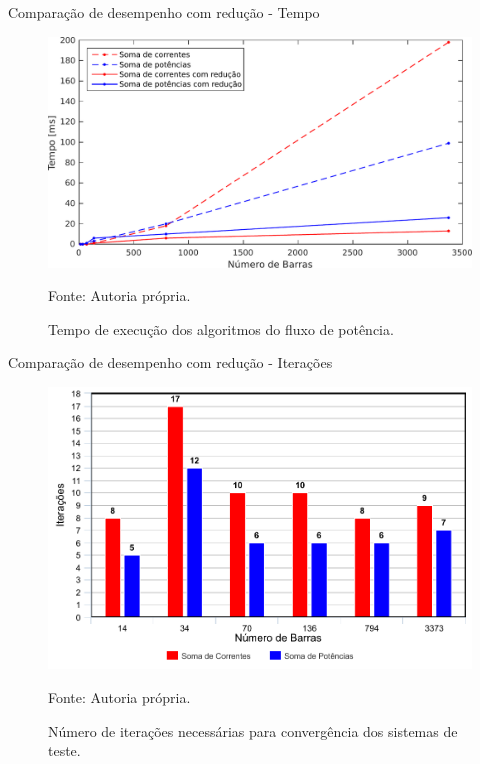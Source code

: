 \documentclass[10pt]{beamer}
\begin{document}
\begin{frame}{Comparação de desempenho com redução - Tempo}
  \begin{figure}[h!]
    \centering
    \caption{Tempo de execução dos algoritmos do fluxo de potência.}
    \includegraphics[scale=0.5]{img/tempootm}
    \label{fig:tempootm}
    
    \small Fonte: Autoria própria.
  \end{figure}
\end{frame}

\begin{frame}{Comparação de desempenho com redução - Iterações}
  \begin{figure}[h!]
    \centering
    \caption{Número de iterações necessárias para convergência dos sistemas de teste.}
    \includegraphics[scale=0.5]{img/iteraotm}
    \label{fig:iteraotm}
    
    \small Fonte: Autoria própria.
  \end{figure}
\end{frame}
\end{document}
